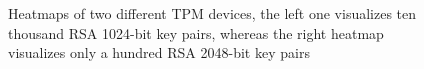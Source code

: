 \begin{figure}[H]
  \centering
  \hfill
  \caption{Heatmaps of two different TPM devices, the left one visualizes ten thousand RSA 1024-bit key pairs, whereas the right heatmap visualizes only a hundred RSA 2048-bit key pairs}
\end{figure}




